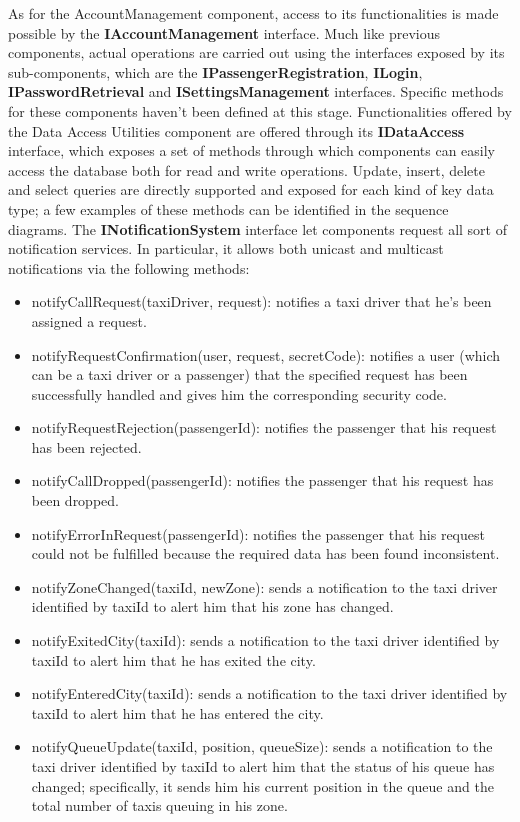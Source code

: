 As for the AccountManagement component, access to its functionalities is made possible by the \textbf{IAccountManagement} interface. Much like previous components, actual operations are carried out using the interfaces exposed by its sub-components, which are the \textbf{IPassengerRegistration}, \textbf{ILogin}, \textbf{IPasswordRetrieval} and \textbf{ISettingsManagement} interfaces. Specific methods for these components haven't been defined at this stage.
Functionalities offered by the Data Access Utilities component are offered through its \textbf{IDataAccess} interface, which exposes a set of methods through which components can easily access the database both for read and write operations. Update, insert, delete and select queries are directly supported and exposed for each kind of key data type; a few examples of these methods can be identified in the sequence diagrams.
The \textbf{INotificationSystem} interface let components request all sort of notification services. In particular, it allows both unicast and multicast notifications via the following methods:
\begin{itemize}
\item notifyCallRequest(taxiDriver, request): notifies a taxi driver that he’s been assigned a request.
\item notifyRequestConfirmation(user, request, secretCode): notifies a user (which can be a taxi driver or a passenger) that the specified request has been successfully handled and gives him the corresponding security code.
\item notifyRequestRejection(passengerId): notifies the passenger that his request has been rejected.
\item notifyCallDropped(passengerId): notifies the passenger that his request has been dropped.
\item notifyErrorInRequest(passengerId): notifies the passenger that his request could not be fulfilled because the required data has been found inconsistent. 
\item notifyZoneChanged(taxiId, newZone): sends a notification to the taxi driver identified by taxiId to alert him that his zone has changed. 
\item notifyExitedCity(taxiId): sends a notification to the taxi driver identified by taxiId to alert him that he has exited the city.
\item notifyEnteredCity(taxiId): sends a notification to the taxi driver identified by taxiId to alert him that he has entered the city.
\item notifyQueueUpdate(taxiId, position, queueSize):  sends a notification to the taxi driver identified by taxiId to alert him that the status of his queue has changed; specifically, it sends him his current position in the queue and the total number of taxis queuing in his zone.
\end{itemize}

